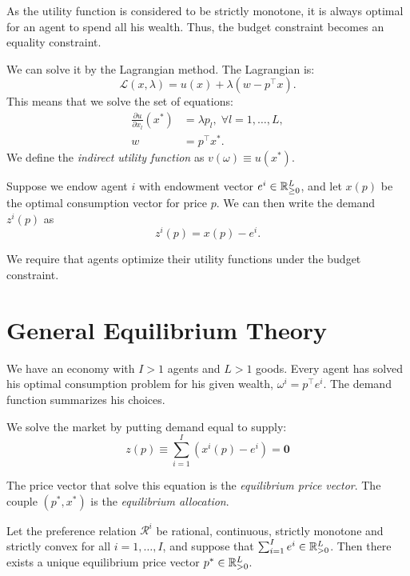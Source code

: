 \documentclass[twoside, titlepage]{article}
\begin{document}
\begin{explanation}
    As the utility function is considered to be strictly monotone, it is always optimal for an agent to spend all his wealth. Thus, the budget constraint becomes an equality constraint.
\end{explanation}

We can solve it by the Lagrangian method. The Lagrangian is:
\[
    \mathcal{L}(x, \lambda) = u(x) + \lambda (w - p^\top x).
\]
This means that we solve the set of equations:
\begin{align*}
    \frac{\partial u}{\partial x_l}\left(x^*\right) &= \lambda p_l, \; \forall l = 1, \dots, L, \\
    w &= p^\top x^*.
\end{align*}
We define the \textit{indirect utility function} as $v(\omega) \equiv u(x^*)$. 

Suppose we endow agent $i$ with endowment vector $e^i \in \mathbb{R}_{\geq0}^L$, and let $x(p)$ be the optimal consumption vector for price $p$. We can then write the demand $z^i(p)$ as
\[
    z^i(p) = x(p) - e^i.
\]

\begin{definition}
    We require that agents optimize their utility functions under the budget constraint.
\end{definition}

\section{General Equilibrium Theory}
We have an economy with $I>1$ agents and $L>1$ goods. Every agent has solved his optimal consumption problem for his given wealth, $\omega^i = p^\top e^i$. The demand function summarizes his choices.

\begin{definition}
    We solve the market by putting demand equal to supply:
    \[
        z(p) \equiv \sum^I_{i=1}(x^i(p) - e^i) = \mathbf{0}
    \]
\end{definition}
The price vector that solve this equation is the \textit{equilibrium price vector}. The couple $(p^*, x^*)$ is the \textit{equilibrium allocation}.

\begin{theorem}
    Let the preference relation $\mathcal{R}^i$ be rational, continuous, strictly monotone and strictly convex for all $i = 1, \dots, I$, and suppose that $\sum^I_{i=1}e^i \in \mathbb{R}_{>0}^L$. Then there exists a unique equilibrium price vector $p^* \in \mathbb{R}_{>0}^L$.
\end{theorem}
\end{document}
